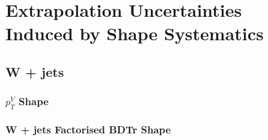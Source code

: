 \chapter{Extrapolation Uncertainties Induced by Shape Systematics}

\section{W + jets}
\subsection{$p_T^V$ Shape}

\subsection{W + jets Factorised BDTr Shape}
